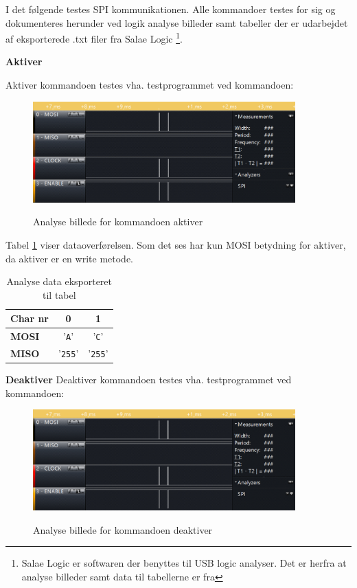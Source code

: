 

I det følgende testes SPI kommunikationen. Alle kommandoer testes for sig og dokumenteres herunder ved logik analyse billeder samt tabeller der er udarbejdet af eksporterede .txt filer fra Salae Logic \footnote{Salae Logic er softwaren der benyttes til USB logic analyser. Det er herfra at analyse billeder samt data til tabellerne er fra}. 


\textbf{Aktiver}

Aktiver kommandoen testes vha. testprogrammet ved kommandoen: 


\begin{figure}[H]
\centering
{\includegraphics[width=0.90\textwidth]{filer/integrationstest/billeder/spi_activate}}
\caption{Analyse billede for kommandoen aktiver}
\label{lab:scop_activate}
\end{figure}

Tabel \ref{table:scop_activate} viser dataoverførelsen. Som det ses har kun MOSI betydning for aktiver, da aktiver er en write metode. 

\begin{table}[H]
	\caption{Analyse data eksporteret til tabel}
	\centering
	\begin{tabular}{|l|c|c|}
		\hline 
		\textbf{Char nr} & \textbf{0} & \textbf{1} \\ 		
		\hline 
		\textbf{MOSI} & '\verb+A+' & '\verb+C+' \\ 
		\hline 
		\textbf{MISO} & '\verb+255+' & '\verb+255+' \\ 
		\hline 
	\end{tabular} 
	\label{table:scop_activate}
\end{table}


\textbf{Deaktiver}
Deaktiver kommandoen testes vha. testprogrammet ved kommandoen: 


\begin{figure}[H]
\centering
{\includegraphics[width=0.90\textwidth]{filer/integrationstest/billeder/spi_deactivate}}
\caption{Analyse billede for kommandoen deaktiver}
\label{lab:scop_deactivate}
\end{figure}

